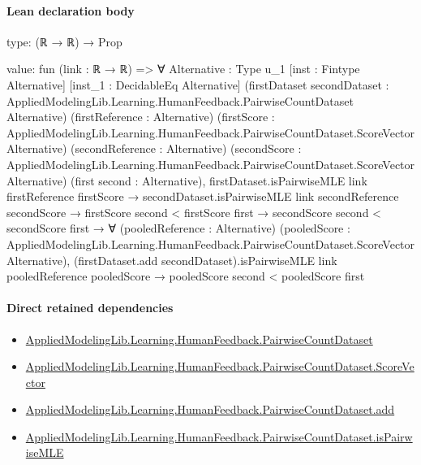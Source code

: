\documentclass[10pt]{article}
\begin{document}
\paragraph{Lean declaration body}
\begin{ReviewVerbatim}
type:
(ℝ → ℝ) → Prop

value:
fun (link : ℝ → ℝ) =>
  ∀ {Alternative : Type u_1} [inst : Fintype Alternative] [inst_1 : DecidableEq Alternative]
    (firstDataset secondDataset : AppliedModelingLib.Learning.HumanFeedback.PairwiseCountDataset Alternative)
    (firstReference : Alternative)
    (firstScore : AppliedModelingLib.Learning.HumanFeedback.PairwiseCountDataset.ScoreVector Alternative)
    (secondReference : Alternative)
    (secondScore : AppliedModelingLib.Learning.HumanFeedback.PairwiseCountDataset.ScoreVector Alternative)
    (first second : Alternative),
    firstDataset.isPairwiseMLE link firstReference firstScore →
      secondDataset.isPairwiseMLE link secondReference secondScore →
        firstScore second < firstScore first →
          secondScore second < secondScore first →
            ∀ (pooledReference : Alternative)
              (pooledScore : AppliedModelingLib.Learning.HumanFeedback.PairwiseCountDataset.ScoreVector Alternative),
              (firstDataset.add secondDataset).isPairwiseMLE link pooledReference pooledScore →
                pooledScore second < pooledScore first
\end{ReviewVerbatim}

\paragraph{Direct retained dependencies}
\begin{itemize}\raggedright
\item \hyperlink{governing-declaration-2ba23f394a8d08a2}{Applied\allowbreak{}Modeling\allowbreak{}Lib.\allowbreak{}Learning.\allowbreak{}Human\allowbreak{}Feedback.\allowbreak{}Pairwise\allowbreak{}Count\allowbreak{}Dataset}
\item \hyperlink{governing-declaration-87eda978eb1b0c9d}{Applied\allowbreak{}Modeling\allowbreak{}Lib.\allowbreak{}Learning.\allowbreak{}Human\allowbreak{}Feedback.\allowbreak{}Pairwise\allowbreak{}Count\allowbreak{}Dataset.\allowbreak{}Score\allowbreak{}Vector}
\item \hyperlink{governing-declaration-8e968e7f0a8d2e37}{Applied\allowbreak{}Modeling\allowbreak{}Lib.\allowbreak{}Learning.\allowbreak{}Human\allowbreak{}Feedback.\allowbreak{}Pairwise\allowbreak{}Count\allowbreak{}Dataset.\allowbreak{}add}
\item \hyperlink{governing-declaration-cba21d23e0e5aa10}{Applied\allowbreak{}Modeling\allowbreak{}Lib.\allowbreak{}Learning.\allowbreak{}Human\allowbreak{}Feedback.\allowbreak{}Pairwise\allowbreak{}Count\allowbreak{}Dataset.\allowbreak{}is\allowbreak{}Pairwise\allowbreak{}MLE}
\end{itemize}
\hypertarget{governing-declaration-7834058159301fab}{}
\end{document}
